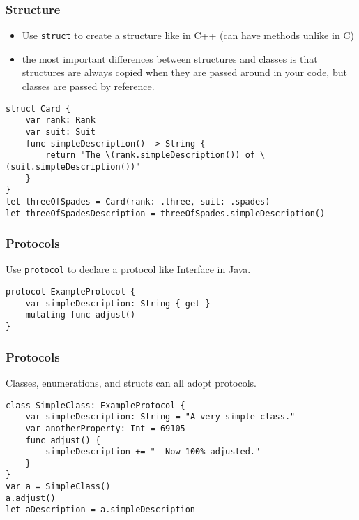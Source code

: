 \begin{frame}[fragile] \frametitle{Structure}

\begin{itemize}
\item Use \lstinline|struct| to create a structure like in C++ (can have methods unlike in C)
\item the most important differences between structures and classes is that structures are always copied when they are passed around in your code, but classes are passed by reference.
\end{itemize}

\begin{lstlisting}[basicstyle=\scriptsize]
struct Card {
    var rank: Rank
    var suit: Suit
    func simpleDescription() -> String {
        return "The \(rank.simpleDescription()) of \(suit.simpleDescription())"
    }
}
let threeOfSpades = Card(rank: .three, suit: .spades)
let threeOfSpadesDescription = threeOfSpades.simpleDescription()
\end{lstlisting}
\end{frame}

\begin{frame}[fragile] \frametitle{Protocols}

Use \lstinline|protocol| to declare a protocol like Interface in Java.


\begin{lstlisting}[basicstyle=\scriptsize]
protocol ExampleProtocol {
    var simpleDescription: String { get }
    mutating func adjust()
}
\end{lstlisting}
\end{frame}

\begin{frame}[fragile] \frametitle{Protocols}

Classes, enumerations, and structs can all adopt protocols.

\begin{lstlisting}[basicstyle=\scriptsize]
class SimpleClass: ExampleProtocol {
    var simpleDescription: String = "A very simple class."
    var anotherProperty: Int = 69105
    func adjust() {
        simpleDescription += "  Now 100% adjusted."
    }
}
var a = SimpleClass()
a.adjust()
let aDescription = a.simpleDescription
\end{lstlisting}
\end{frame}

